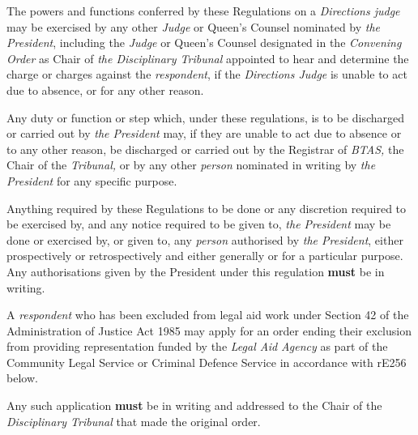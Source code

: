 \par
{}
The powers and functions conferred by these Regulations on
a \emph{Directions judge} may be exercised by any other \emph{Judge} or
Queen's Counsel nominated by \emph{the President}, including
the \emph{Judge} or Queen's Counsel designated in the \emph{Convening
Order} as Chair of\emph{ the Disciplinary Tribunal} appointed to hear
and determine the charge or charges against the \emph{respondent}, if
the \emph{Directions Judge} is unable to act due to absence, or for any
other reason.\\
\par
Any duty or function or step which, under these regulations, is to be
discharged or carried out by \emph{the President} may, if they are
unable to act due to absence or to any other reason, be discharged or
carried out by the Registrar of \emph{BTAS, }the Chair of
the \emph{Tribunal, }or by any other \emph{person }nominated in writing
by \emph{the President }for any specific purpose.\\
\par
Anything required by these Regulations to be done or any discretion
required to be exercised by, and any notice required to be given
to, \emph{the President} may be done or exercised by, or given to,
any \emph{person} authorised by \emph{the President}, either
prospectively or retrospectively and either generally or for a
particular purpose. Any authorisations given by the President under this
regulation  \textcolor{myred}{\textbf{must}} be in writing.\\
\par
{}
A \emph{respondent} who has been excluded from legal aid work under
Section 42 of the Administration of Justice Act 1985 may apply for an
order ending their exclusion from providing representation funded by
the \emph{Legal Aid Agency} as part of the Community Legal Service or
Criminal Defence Service in accordance with rE256 below.\\
\par
Any such application  \textcolor{myred}{\textbf{must}} be in writing and addressed to the Chair of
the\emph{ Disciplinary Tribunal }that made the original order.\\
\par
